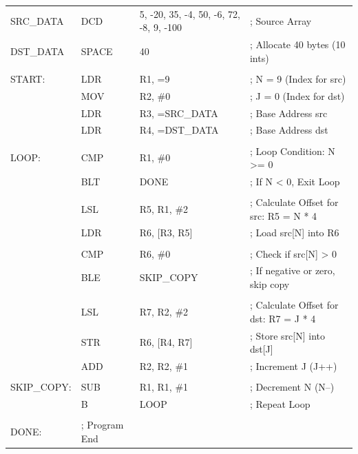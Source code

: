 \documentclass[a4paper,12pt]{article}
\begin{document}
\begin{center}
\begin{tabular}{llll}
SRC\_DATA & DCD   & 5, -20, 35, -4, 50, -6, 72, -8, 9, -100 & ; Source Array \\
DST\_DATA & SPACE & 40                 & ; Allocate 40 bytes (10 ints) \\
\\
START:    & LDR   & R1, =9            & ; N = 9 (Index for src) \\
          & MOV   & R2, \#0            & ; J = 0 (Index for dst) \\
          & LDR   & R3, =SRC\_DATA     & ; Base Address src \\
          & LDR   & R4, =DST\_DATA     & ; Base Address dst \\
\\
LOOP:     & CMP   & R1, \#0            & ; Loop Condition: N >= 0 \\
          & BLT   & DONE              & ; If N < 0, Exit Loop \\
\\
          & LSL   & R5, R1, \#2        & ; Calculate Offset for src: R5 = N * 4 \\
          & LDR   & R6, [R3, R5]      & ; Load src[N] into R6 \\
\\
          & CMP   & R6, \#0            & ; Check if src[N] > 0 \\
          & BLE   & SKIP\_COPY         & ; If negative or zero, skip copy \\
\\
          & LSL   & R7, R2, \#2        & ; Calculate Offset for dst: R7 = J * 4 \\
          & STR   & R6, [R4, R7]      & ; Store src[N] into dst[J] \\
          & ADD   & R2, R2, \#1        & ; Increment J (J++) \\
\\
SKIP\_COPY: & SUB   & R1, R1, \#1        & ; Decrement N (N--) \\
          & B     & LOOP              & ; Repeat Loop \\
\\
DONE:     & ; Program End             & \\
\end{tabular}
\end{center}
\end{document}
